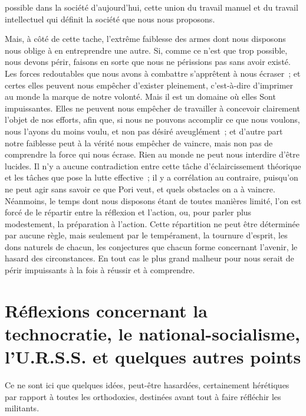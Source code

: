 \documentclass[french,twoside]{book} %
\newcommand{\signed}[1]{\bigbreak\filbreak{\raggedleft #1\par}\medskip}
\begin{document}
possible dans la société d'aujourd'hui, cette union du travail manuel et du travail intellectuel qui définit la société que nous nous proposons.\par
Mais, à côté de cette tache, l'extrême faiblesse des armes dont nous disposons nous oblige à en entreprendre une autre. Si, comme ce n'est que trop possible, nous devons périr, faisons en sorte que nous ne périssions pas sans avoir existé. Les forces redoutables que nous avons à combattre s'apprêtent à nous écraser ; et certes elles peuvent nous empêcher d'exister pleinement, c'est-à-dire d'imprimer au monde la marque de notre volonté. Mais il est un domaine où elles Sont impuissantes. Elles ne peuvent nous empêcher de travailler à concevoir clairement l'objet de nos efforts, afin que, si nous ne pouvons accomplir ce que nous voulons, nous l'ayons du moins voulu, et non pas désiré aveuglément ; et d'autre part notre faiblesse peut à la vérité nous empêcher de vaincre, mais non pas de comprendre la force qui nous écrase. Rien au monde ne peut nous interdire d'être lucides. Il n'y a aucune contradiction entre cette tâche d'éclaircissement théorique et les tâches que pose la lutte effective ; il y a corrélation au contraire, puisqu'on ne peut agir sans savoir ce que Pori veut, et quels obstacles on a à vaincre. Néanmoins, le temps dont nous disposons étant de toutes manières limité, l'on est forcé de le répartir entre la réflexion et l'action, ou, pour parler plus modestement, la préparation à l'action. Cette répartition ne peut être déterminée par aucune règle, mais seulement par le tempérament, la tournure d'esprit, les dons naturels de chacun, les conjectures que chacun forme concernant l'avenir, le hasard des circonstances. En tout cas le plus grand malheur pour nous serait de périr impuissants à la fois à réussir et à comprendre.\par


\signed{{\itshape (Révolution Prolétarienne}, no 158, 25 août 1933.)}
\section[Réflexions concernant la technocratie, le national-socialisme, l’U.R.S.S. et quelques autres points]{Réflexions concernant la technocratie, le national-socialisme, l’U.R.S.S. et quelques autres points}\renewcommand{\leftmark}{Réflexions concernant la technocratie, le national-socialisme, l’U.R.S.S. et quelques autres points}

\noindent \par
Ce ne sont ici que quelques idées, peut-être hasardées, certainement hérétiques par rapport à toutes les orthodoxies, destinées avant tout à faire réfléchir les militants.\par
\end{document}
